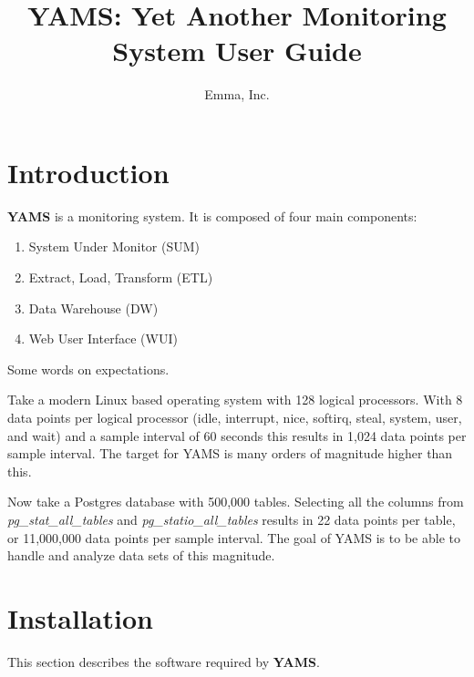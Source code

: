 \documentclass[a4paper,twoside,12pt]{article}
\title{YAMS: Yet Another Monitoring System User Guide}
\author{Emma, Inc.}
\date{}
\begin{document}
\maketitle

\section{Introduction}

\textbf{YAMS} is a monitoring system.  It is composed of four main components:
\begin{enumerate}
  \item System Under Monitor (SUM)
  \item Extract, Load, Transform (ETL)
  \item Data Warehouse (DW)
  \item Web User Interface (WUI)
\end{enumerate}

Some words on expectations.

Take a modern Linux based operating system with 128 logical processors.  With
8 data points per logical processor (idle, interrupt, nice, softirq, steal,
system, user, and wait) and a sample interval of 60 seconds this results in
1,024 data points per sample interval.  The target for YAMS is many orders of
magnitude higher than this.

Now take a Postgres database with 500,000 tables.  Selecting all the columns
from \textit{pg\_stat\_all\_tables} and \textit{pg\_statio\_all\_tables}
results in 22 data points per table, or 11,000,000 data points per sample
interval.  The goal of YAMS is to be able to handle and analyze data sets of
this magnitude.

\section{Installation}

This section describes the software required by \textbf{YAMS}.
\end{document}
